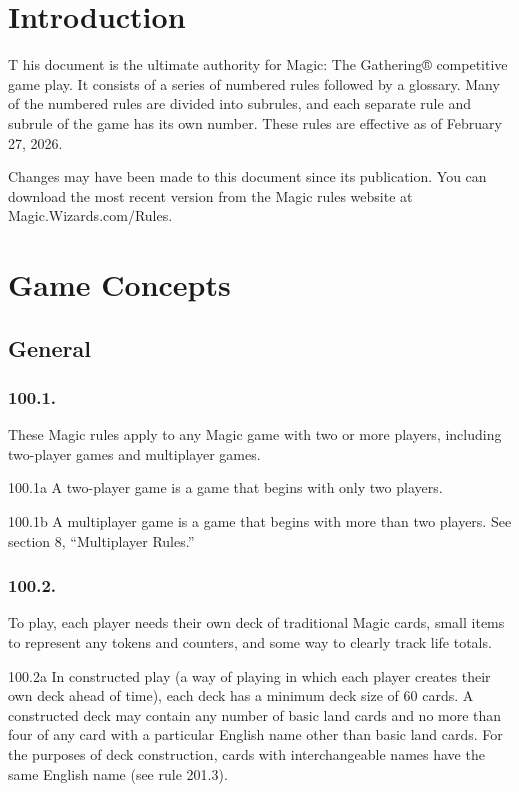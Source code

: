 	\chapter*{Introduction}
\lettrine[lines=3, depth=0]{T}{ } his document is the ultimate authority for Magic: The Gathering® competitive game play. It consists of a series of numbered rules followed by a glossary. Many of the numbered rules are divided into subrules, and each separate rule and subrule of the game has its own number. These rules are effective as of February 27, 2026.

Changes may have been made to this document since its publication. You can download the most recent version from the Magic rules website at Magic.Wizards.com/Rules.

\chapter{Game Concepts}
\setcounter{section}{99}
\section{General}
\subsection*{100.1.}
These Magic rules apply to any Magic game with two or more players, including two-player games and multiplayer games.

100.1a A two-player game is a game that begins with only two players.

100.1b A multiplayer game is a game that begins with more than two players. See section 8, “Multiplayer Rules.”

\subsection*{100.2.}
To play, each player needs their own deck of traditional Magic cards, small items to represent any tokens and counters, and some way to clearly track life totals.

100.2a In constructed play (a way of playing in which each player creates their own deck ahead of time), each deck has a minimum deck size of 60 cards. A constructed deck may contain any number of basic land cards and no more than four of any card with a particular English name other than basic land cards. For the purposes of deck construction, cards with interchangeable names have the same English name (see rule 201.3).

